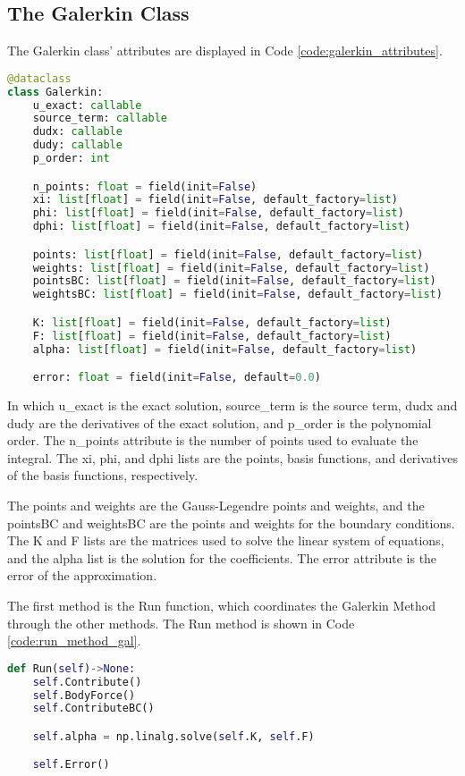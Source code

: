\subsection{The Galerkin Class}\label{subsec:galerkin_class}
The Galerkin class' attributes are displayed in Code \ref{code:galerkin_attributes}.
\begin{lstlisting}[caption={Attributes of the Galerkin class},label={code:galerkin_attributes},language=python]
@dataclass
class Galerkin:
    u_exact: callable
    source_term: callable
    dudx: callable
    dudy: callable
    p_order: int

    n_points: float = field(init=False)
    xi: list[float] = field(init=False, default_factory=list)
    phi: list[float] = field(init=False, default_factory=list)
    dphi: list[float] = field(init=False, default_factory=list)

    points: list[float] = field(init=False, default_factory=list)
    weights: list[float] = field(init=False, default_factory=list)
    pointsBC: list[float] = field(init=False, default_factory=list)
    weightsBC: list[float] = field(init=False, default_factory=list)

    K: list[float] = field(init=False, default_factory=list)
    F: list[float] = field(init=False, default_factory=list)
    alpha: list[float] = field(init=False, default_factory=list)

    error: float = field(init=False, default=0.0)
\end{lstlisting}

In which u\_exact is the exact solution, source\_term is the source term, dudx and dudy are the derivatives of the exact solution, and p\_order is the polynomial order. The n\_points attribute is the number of points used to evaluate the integral. The xi, phi, and dphi lists are the points, basis functions, and derivatives of the basis functions, respectively. 

The points and weights are the Gauss-Legendre points and weights, and the pointsBC and weightsBC are the points and weights for the boundary conditions. The K and F lists are the matrices used to solve the linear system of equations, and the alpha list is the solution for the coefficients. The error attribute is the error of the approximation.

The first method is the Run function, which coordinates the Galerkin Method through the other methods. The Run method is shown in Code \ref{code:run_method_gal}.
\begin{lstlisting}[caption={Run method},label={code:run_method_gal},language=python]
def Run(self)->None:
    self.Contribute()
    self.BodyForce()
    self.ContributeBC()

    self.alpha = np.linalg.solve(self.K, self.F)

    self.Error()
\end{lstlisting}

